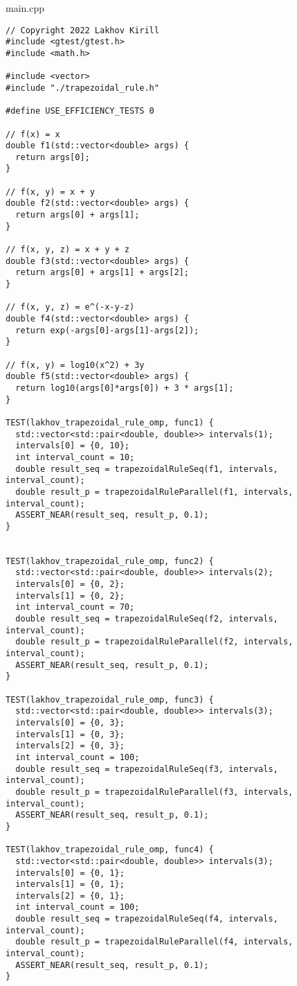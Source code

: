 \documentclass{report}
\begin{document}
main.cpp
\begin{lstlisting}
// Copyright 2022 Lakhov Kirill
#include <gtest/gtest.h>
#include <math.h>

#include <vector>
#include "./trapezoidal_rule.h"

#define USE_EFFICIENCY_TESTS 0

// f(x) = x
double f1(std::vector<double> args) {
  return args[0];
}

// f(x, y) = x + y
double f2(std::vector<double> args) {
  return args[0] + args[1];
}

// f(x, y, z) = x + y + z
double f3(std::vector<double> args) {
  return args[0] + args[1] + args[2];
}

// f(x, y, z) = e^(-x-y-z)
double f4(std::vector<double> args) {
  return exp(-args[0]-args[1]-args[2]);
}

// f(x, y) = log10(x^2) + 3y
double f5(std::vector<double> args) {
  return log10(args[0]*args[0]) + 3 * args[1];
}

TEST(lakhov_trapezoidal_rule_omp, func1) {
  std::vector<std::pair<double, double>> intervals(1);
  intervals[0] = {0, 10};
  int interval_count = 10;
  double result_seq = trapezoidalRuleSeq(f1, intervals, interval_count);
  double result_p = trapezoidalRuleParallel(f1, intervals, interval_count);
  ASSERT_NEAR(result_seq, result_p, 0.1);
}


TEST(lakhov_trapezoidal_rule_omp, func2) {
  std::vector<std::pair<double, double>> intervals(2);
  intervals[0] = {0, 2};
  intervals[1] = {0, 2};
  int interval_count = 70;
  double result_seq = trapezoidalRuleSeq(f2, intervals, interval_count);
  double result_p = trapezoidalRuleParallel(f2, intervals, interval_count);
  ASSERT_NEAR(result_seq, result_p, 0.1);
}

TEST(lakhov_trapezoidal_rule_omp, func3) {
  std::vector<std::pair<double, double>> intervals(3);
  intervals[0] = {0, 3};
  intervals[1] = {0, 3};
  intervals[2] = {0, 3};
  int interval_count = 100;
  double result_seq = trapezoidalRuleSeq(f3, intervals, interval_count);
  double result_p = trapezoidalRuleParallel(f3, intervals, interval_count);
  ASSERT_NEAR(result_seq, result_p, 0.1);
}

TEST(lakhov_trapezoidal_rule_omp, func4) {
  std::vector<std::pair<double, double>> intervals(3);
  intervals[0] = {0, 1};
  intervals[1] = {0, 1};
  intervals[2] = {0, 1};
  int interval_count = 100;
  double result_seq = trapezoidalRuleSeq(f4, intervals, interval_count);
  double result_p = trapezoidalRuleParallel(f4, intervals, interval_count);
  ASSERT_NEAR(result_seq, result_p, 0.1);
}


\end{lstlisting}
\end{document}
